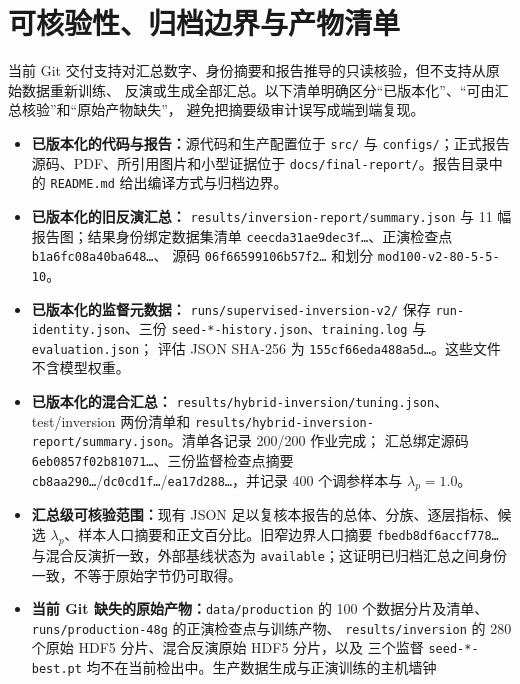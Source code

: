 \documentclass[UTF8,a4paper,11pt]{ctexart}
\begin{document}
\section{可核验性、归档边界与产物清单}\label{app:repro}
\begin{sloppypar}
当前 Git 交付支持对汇总数字、身份摘要和报告推导的只读核验，但不支持从原始数据重新训练、
反演或生成全部汇总。以下清单明确区分``已版本化''、``可由汇总核验''和``原始产物缺失''，
避免把摘要级审计误写成端到端复现。

\begin{itemize}
\item \textbf{已版本化的代码与报告：}源代码和生产配置位于 \texttt{src/} 与
      \texttt{configs/}；正式报告源码、PDF、所引用图片和小型证据位于
      \texttt{docs/final-report/}。报告目录中的 \texttt{README.md} 给出编译方式与归档边界。
\item \textbf{已版本化的旧反演汇总：}
      \texttt{results/inversion-report/summary.json} 与 11 幅报告图；结果身份绑定数据集清单
      \texttt{ceecda31ae9dec3f\ldots}、正演检查点 \texttt{b1a6fc08a40ba648\ldots}、
      源码 \texttt{06f66599106b57f2\ldots} 和划分
      \texttt{mod100-v2-80-5-5-10}。
\item \textbf{已版本化的监督元数据：}
      \texttt{runs/supervised-inversion-v2/} 保存 \texttt{run-identity.json}、三份
      \texttt{seed-*-history.json}、\texttt{training.log} 与 \texttt{evaluation.json}；
      评估 JSON SHA-256 为 \texttt{155cf66eda488a5d\ldots}。这些文件不含模型权重。
\item \textbf{已版本化的混合汇总：}
      \texttt{results/hybrid-inversion/tuning.json}、test/inversion 两份清单和
      \texttt{results/hybrid-inversion-report/summary.json}。清单各记录 200/200 作业完成；
      汇总绑定源码 \texttt{6eb0857f02b81071\ldots}、三份监督检查点摘要
      \texttt{cb8aa290\ldots}/\texttt{dc0cd1f\ldots}/\texttt{ea17d288\ldots}，并记录
      400 个调参样本与 \(\lambda_p=1.0\)。
\item \textbf{汇总级可核验范围：}现有 JSON 足以复核本报告的总体、分族、逐层指标、候选
      \(\lambda_p\)、样本人口摘要和正文百分比。旧窄边界人口摘要
      \texttt{fbedb8df6accf778\ldots} 与混合反演折一致，外部基线状态为
      \texttt{available}；这证明已归档汇总之间身份一致，不等于原始字节仍可取得。
\item \textbf{当前 Git 缺失的原始产物：}\texttt{data/production} 的 100 个数据分片及清单、
      \texttt{runs/production-48g} 的正演检查点与训练产物、
      \texttt{results/inversion} 的 280 个原始 HDF5 分片、混合反演原始 HDF5 分片，以及
      三个监督 \texttt{seed-*-best.pt} 均不在当前检出中。生产数据生成与正演训练的主机墙钟

\end{itemize}
\end{sloppypar}
\end{document}
